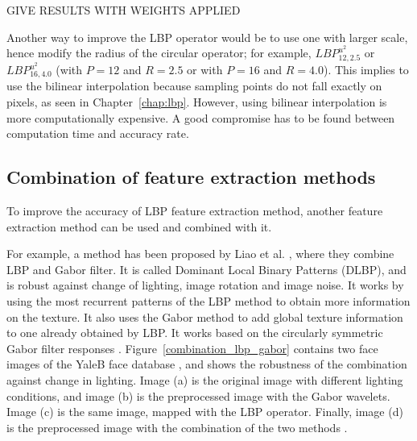 \noindent GIVE RESULTS WITH WEIGHTS APPLIED
\newline

\noindent Another way to improve the LBP operator would be to use one with larger scale, hence modify the radius of the circular operator; for example, $ LBP_{12,2.5}^{u^2} $ or $ LBP_{16,4.0}^{u^2} $ (with $ P = 12 $ and $ R = 2.5 $ or with $ P = 16 $ and $ R = 4.0 $). This implies to use the bilinear interpolation because sampling points do not fall exactly on pixels, as seen in Chapter~\ref{chap:lbp}. However, using bilinear interpolation is more computationally expensive. A good compromise has to be found between computation time and accuracy rate.
\newline

\subsection{Combination of feature extraction methods}

\vspace{\baselineskip}
\noindent To improve the accuracy of LBP feature extraction method, another feature extraction method can be used and combined with it. 
\newline

\noindent  For example, a method has been proposed by Liao et al. \cite{LIA09}, where they combine LBP and Gabor filter. It is called Dominant Local Binary Patterns (DLBP), and is robust against change of lighting, image rotation and image noise.  It works by using the most recurrent patterns of the LBP method to obtain more information on the texture. It also uses the Gabor method to add global texture information to one already obtained by LBP. It works based on the circularly symmetric Gabor filter responses \cite{LIA09}. Figure~\ref{combination_lbp_gabor} contains two face images of the YaleB face database , and shows the robustness of the combination against change in lighting. Image (a) is the original image with different lighting conditions, and image (b) is the preprocessed image with the Gabor wavelets. Image (c) is the same image, mapped with the LBP operator. Finally, image (d) is the preprocessed image with the combination of the two methods \cite{GOH11}.
\newline

